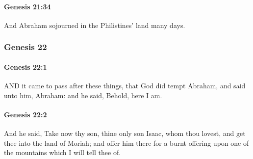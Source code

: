 		\paragraph{Genesis 21:34} %
			\label{GENESIS-21-34}

			And Abraham sojourned in the Philistines' land many days.


	\subsubsection{Genesis 22} %
		\label{GENESIS-22}
		
		\paragraph{Genesis 22:1} %
			\label{GENESIS-22-1}

			AND it came to pass after these things, that God did tempt Abraham, and said unto him, Abraham: and he said, Behold, here I am.


		\paragraph{Genesis 22:2} %
			\label{GENESIS-22-2}

			And he said, Take now thy son, thine only son Isaac, whom thou lovest, and get thee into the land of Moriah; and offer him there for a burnt offering upon one of the mountains which I will tell thee of.

